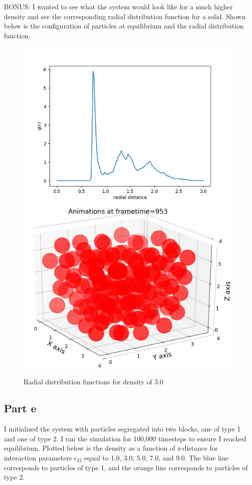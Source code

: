 \documentclass{article}
\begin{document}
	BONUS: I wanted to see what the system would look like for a much higher density and see the corresponding radial distribution function for a solid. Shown below is the configuration of particles at equilibrium and the radial distribution function.

		\begin{figure}[H]
				\centering
				\includegraphics[scale=0.5]{gofr_300}
				\includegraphics[scale=0.35]{gofr_config}
				\caption{Radial distribution functions for density of 3.0}
		\end{figure}



\subsection*{Part e}
	I initialized the system with particles segregated into two blocks, one of type 1 and one of type 2. I ran the simulation for 100,000 timesteps to ensure I reached equilibrium. Plotted below is the density as a function of z-distance for interaction parameters $\epsilon_22$ equal to 1.0, 3.0, 5.0, 7.0, and 9.0. The blue line corresponds to particles of type 1, and the orange line corresponds to particles of type 2.
\end{document}
